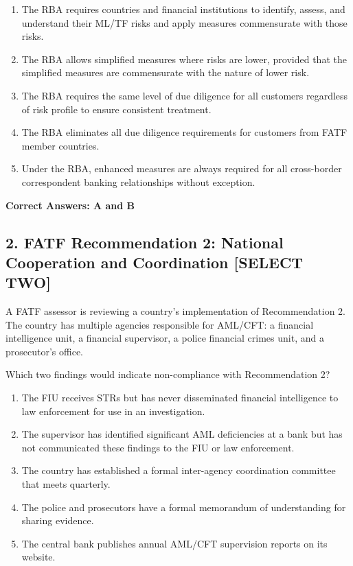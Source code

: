 \documentclass[11pt,a4paper]{article}
\begin{document}
	\begin{enumerate}[label=\Alph*.]
		\item The RBA requires countries and financial institutions to identify, assess, and understand their ML/TF risks and apply measures commensurate with those risks.
		\item The RBA allows simplified measures where risks are lower, provided that the simplified measures are commensurate with the nature of lower risk.
		\item The RBA requires the same level of due diligence for all customers regardless of risk profile to ensure consistent treatment.
		\item The RBA eliminates all due diligence requirements for customers from FATF member countries.
		\item Under the RBA, enhanced measures are always required for all cross-border correspondent banking relationships without exception.
	\end{enumerate}
	
	\textbf{Correct Answers: A and B}
	
	\subsection{2. FATF Recommendation 2: National Cooperation and Coordination \textnormal{[SELECT TWO]}}
	
	A FATF assessor is reviewing a country's implementation of Recommendation 2. The country has multiple agencies responsible for AML/CFT: a financial intelligence unit, a financial supervisor, a police financial crimes unit, and a prosecutor's office.
	
	Which two findings would indicate non-compliance with Recommendation 2?
	
	\begin{enumerate}[label=\Alph*.]
		\item The FIU receives STRs but has never disseminated financial intelligence to law enforcement for use in an investigation.
		\item The supervisor has identified significant AML deficiencies at a bank but has not communicated these findings to the FIU or law enforcement.
		\item The country has established a formal inter-agency coordination committee that meets quarterly.
		\item The police and prosecutors have a formal memorandum of understanding for sharing evidence.
		\item The central bank publishes annual AML/CFT supervision reports on its website.
	\end{enumerate}
	
\end{document}
